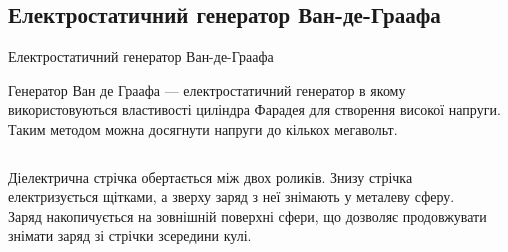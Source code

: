 \documentclass{beamer}
\begin{document}
\subsection{Електростатичний генератор Ван-де-Граафа}



\begin{frame}{Електростатичний генератор Ван-де-Граафа}{}
	\begin{block}{}
		Генератор Ван де Граафа --- електростатичний генератор в якому використовуються властивості
		циліндра Фарадея для створення високої напруги. Таким методом можна досягнути напруги до
		кількох мегавольт.
	\end{block}
	\begin{columns}
		\begin{column}{0.7\linewidth}
			\begin{block}{}\justifying\small
				Діелектрична стрічка обертається між двох роликів. Знизу стрічка електризується
				щітками, а зверху заряд з неї знімають у металеву сферу. Заряд накопичується на
				зовнішній поверхні сфери, що дозволяє продовжувати знімати заряд зі стрічки
				зсередини кулі.
			\end{block}
		\end{column}
		\begin{column}{0.3\linewidth}\centering

\end{column}
\end{columns}
\end{frame}
\end{document}
